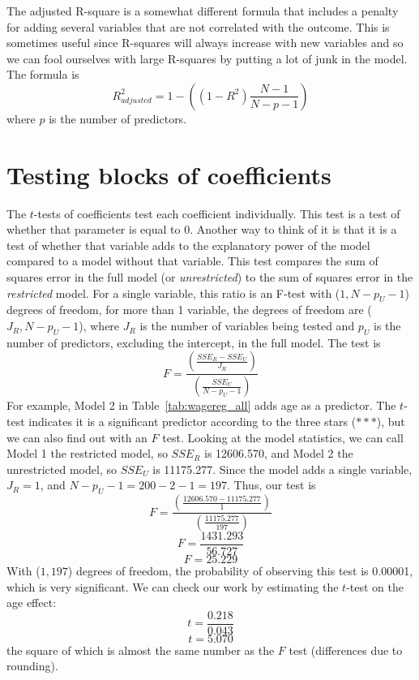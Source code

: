 The adjusted R-square is a somewhat different formula that includes a penalty for adding several variables that are not correlated with the outcome. This is sometimes useful since R-squares will always increase with new variables and so we can fool ourselves with large R-squares by putting a lot of junk in the model. The formula is
\begin{equation}
R_{adjusted}^2=1-\left(\left(1-R^2\right)\frac{N-1}{N-p-1}\right)
\end{equation}
where $p$ is the number of predictors.
\section{Testing blocks of coefficients}
The $t$-tests of coefficients test each coefficient individually. This test is a test of whether that parameter is equal to 0. Another way to think of it is that it is a test of whether that variable adds to the explanatory power of the model compared to a model without that variable. This test compares the sum of squares error in the full model (or {\it unrestricted}) to the sum of squares error in the {\it restricted} model. For a single variable, this ratio is an F-test with ($1,N-p_U-1$) degrees of freedom, for more than 1 variable, the degrees of freedom are ($J_R,N-p_U-1$), where $J_R$ is the number of variables being tested and $p_U$ is the number of predictors, excluding the intercept, in the full model. The test is
\begin{equation}
F=\frac{\left(\frac{SSE_R-SSE_U}{J_R}\right)}{\left(\frac{SSE_U}{N-p_U-1}\right)}
\end{equation}
For example, Model 2 in Table~\ref{tab:wagereg_all} adds age as a predictor. The $t$-test indicates it is a significant predictor according to the three stars ($***$), but we can also find out with an $F$ test. Looking at the model statistics, we can call Model 1 the restricted model, so $SSE_R$ is 12606.570, and Model 2 the unrestricted model, so $SSE_U$ is 11175.277. Since the model adds a single variable, $J_R = 1$, and $N-p_U-1 = 200-2-1 = 197$. Thus, our test is
\[
F=\frac{\left(\frac{12606.570-11175.277}{1}\right)}{\left(\frac{11175.277}{197}\right)}
\]
\[
F=\frac{1431.293}{56.727}
\]
\[
F=25.229
\]
With ($1,197$) degrees of freedom, the probability of observing this test is 0.00001, which is very significant. We can check our work by estimating the $t$-test on the age effect:
\[
t=\frac{0.218}{0.043}
\]
\[
t=5.070
\]
the square of which is almost the same number as the $F$ test (differences due to rounding).


